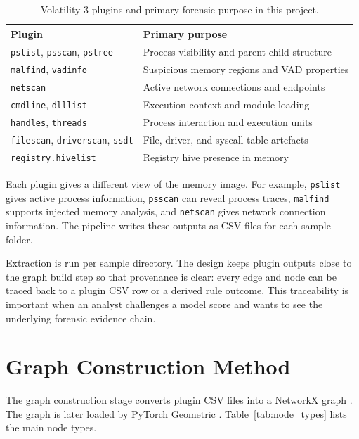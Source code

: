 \begin{table}[htbp]
\centering
\caption{Volatility 3 plugins and primary forensic purpose in this project.}
\label{tab:plugin_mapping}
\small
\begin{tabular}{p{3.8cm}p{8.2cm}}
\toprule
\textbf{Plugin} & \textbf{Primary purpose} \\
\midrule
\texttt{pslist}, \texttt{psscan}, \texttt{pstree} & Process visibility and parent-child structure \\
\texttt{malfind}, \texttt{vadinfo} & Suspicious memory regions and VAD properties \\
\texttt{netscan} & Active network connections and endpoints \\
\texttt{cmdline}, \texttt{dlllist} & Execution context and module loading \\
\texttt{handles}, \texttt{threads} & Process interaction and execution units \\
\texttt{filescan}, \texttt{driverscan}, \texttt{ssdt} & File, driver, and syscall-table artefacts \\
\texttt{registry.hivelist} & Registry hive presence in memory \\
\bottomrule
\end{tabular}
\end{table}

Each plugin gives a different view of the memory image. For example, \texttt{pslist} gives active process information, \texttt{psscan} can reveal process traces, \texttt{malfind} supports injected memory analysis, and \texttt{netscan} gives network connection information. The pipeline writes these outputs as CSV files for each sample folder.

Extraction is run per sample directory. The design keeps plugin outputs close to the graph build step so that provenance is clear: every edge and node can be traced back to a plugin CSV row or a derived rule outcome. This traceability is important when an analyst challenges a model score and wants to see the underlying forensic evidence chain.

\section{Graph Construction Method}

The graph construction stage converts plugin CSV files into a NetworkX graph \cite{hagberg2008networkx}. The graph is later loaded by PyTorch Geometric \cite{fey2019pyg}. Table~\ref{tab:node_types} lists the main node types.


